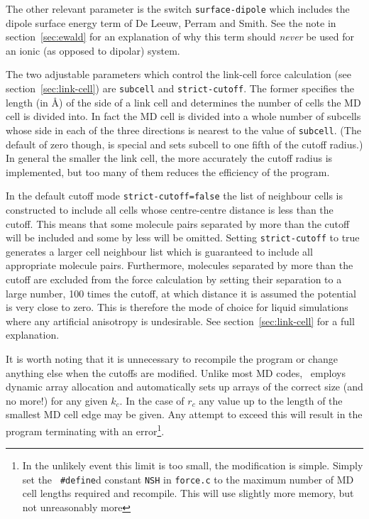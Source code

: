 The other relevant parameter is the switch \verb'surface-dipole' which
includes the dipole surface energy term of De Leeuw, Perram and
Smith\cite{deleeuw:80}.  See the note in section~\ref{sec:ewald} for an
explanation of why this term should {\em never\/} be used for an ionic
(as opposed to dipolar) system.

The two adjustable parameters which control the link-cell force
calculation (see section~\ref{sec:link-cell}) are \verb'subcell' and
\verb'strict-cutoff'. The former specifies the length (in \AA) of the side of
a link cell and determines the number of cells the MD cell is divided
into. In fact the MD cell is divided into a whole number of subcells
whose side in each of the three directions is nearest to the value of
\verb'subcell'.  (The default of zero though, is special and sets
subcell to one fifth of the cutoff radius.)  In general the smaller
the link cell, the more accurately the cutoff radius is implemented,
but too many of them reduces the efficiency of the program.

In the default cutoff mode \verb'strict-cutoff=false' the list of
neighbour cells is constructed to include all cells whose
centre-centre distance is less than the cutoff.  This means that some
molecule pairs separated by more than the cutoff will be included and
some by less will be omitted.  Setting \verb'strict-cutoff' to true
generates a larger cell neighbour list which is guaranteed to include
all appropriate molecule pairs.  Furthermore, molecules separated by
more than the cutoff are excluded from the force calculation by
setting their separation to a large number, 100 times the cutoff, at
which distance it is assumed the potential is very close to zero.
This is therefore the mode of choice for liquid simulations where any
artificial anisotropy is undesirable.  See section~\ref{sec:link-cell}
for a full explanation.

It is worth noting that it is unnecessary to recompile the program or
change anything else when the cutoffs are modified. Unlike most MD
codes, \moldy\  employs dynamic array allocation and automatically sets
up arrays of the correct size (and no more!) for any given $k_{c}$.
In the case of $r_{c}$ any value up to the length of the smallest MD
cell edge may be given. Any attempt to exceed this will result in the
program terminating with an error\footnote{In the unlikely event this
limit is too small, the modification is simple.  Simply set the {\tt
\#define}d constant {\tt NSH} in {\tt force.c} to the maximum number of
MD cell lengths required and recompile.  This will use slightly more
memory, but not unreasonably more}.

